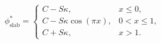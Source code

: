 $$
\phi^\ast_{\mathrm{slab}} = \begin{cases}
C - S \kappa, & x\le 0,\\
C - S \kappa \cos{\left(\pi x \right)}, & 0<x\le 1,\\
C + S \kappa, & x>1.
\end{cases}
$$

